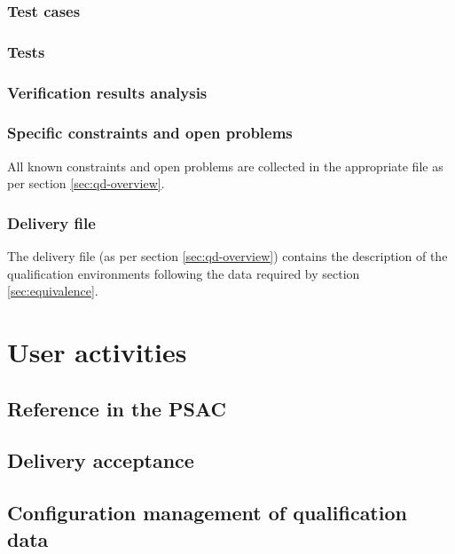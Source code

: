 \documentclass {report}
\begin{document}
\subsection{Test cases}
\subsection{Tests}
\subsection{Verification results analysis}

\subsection{Specific constraints and open problems}
\label{sec:constr-problems}
All known constraints and open problems are collected in the appropriate file as per section \ref{sec:qd-overview}.

\subsection{Delivery file}
\label{sec:delivery}
The delivery file (as per section \ref{sec:qd-overview}) contains the description of the qualification environments following the data required by section \ref{sec:equivalence}.

\chapter{User activities}
\label{sec:user-act}
\section{Reference \xcov in the PSAC}
\section{Delivery acceptance}
\section{Configuration management of qualification data}
\end{document}
